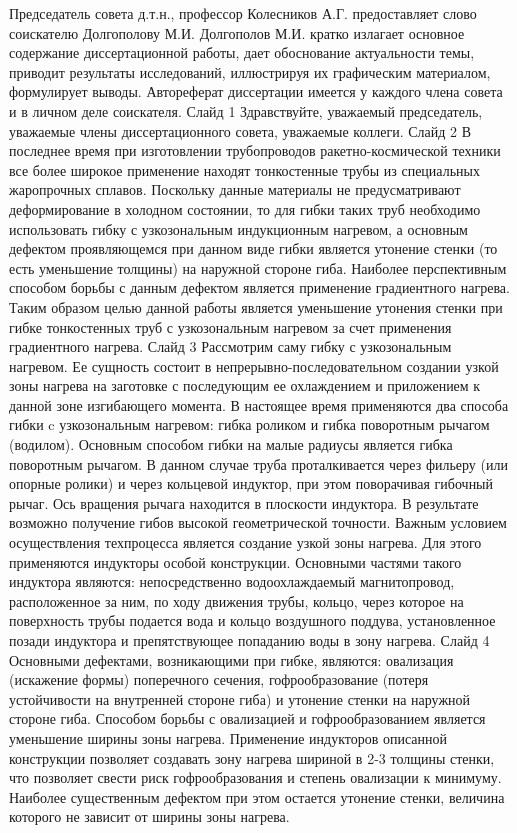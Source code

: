 Председатель совета д.т.н., профессор Колесников А.Г. предоставляет слово соискателю Долгополову М.И.
Долгополов М.И. кратко излагает основное содержание диссертационной работы, дает обоснование актуальности темы, приводит результаты исследований, иллюстрируя их графическим материалом, формулирует выводы. Автореферат диссертации имеется у каждого члена совета и в личном деле соискателя.
Слайд 1
Здравствуйте, уважаемый председатель, уважаемые члены диссертационного совета, уважаемые коллеги.
Слайд 2
В последнее время при изготовлении трубопроводов ракетно-космической техники все более широкое применение находят тонкостенные трубы из специальных жаропрочных сплавов. Поскольку данные материалы не предусматривают деформирование в холодном состоянии, то для гибки таких труб необходимо использовать гибку с узкозональным индукционным нагревом, а основным дефектом проявляющемся при данном виде гибки является утонение стенки (то есть уменьшение толщины) на наружной стороне гиба. Наиболее перспективным способом борьбы с данным дефектом является применение градиентного нагрева.
Таким образом целью данной работы является уменьшение утонения стенки при гибке тонкостенных труб с узкозональным нагревом за счет применения градиентного нагрева.
Слайд 3
Рассмотрим саму гибку с узкозональным нагревом. Ее сущность состоит в непрерывно-последовательном создании узкой зоны нагрева на заготовке с последующим ее охлаждением и приложением к данной зоне изгибающего момента.
В настоящее время применяются два способа гибки c узкозональным нагревом: гибка роликом и гибка поворотным рычагом (водилом). 
Основным способом гибки на малые радиусы является гибка поворотным рычагом. В данном случае труба проталкивается через фильеру (или опорные ролики) и через кольцевой индуктор, при этом поворачивая гибочный рычаг. Ось вращения рычага находится в плоскости индуктора. В результате возможно получение гибов высокой геометрической точности.
Важным условием осуществления техпроцесса является создание узкой зоны нагрева. Для этого применяются индукторы особой конструкции. Основными частями такого индуктора являются: непосредственно водоохлаждаемый магнитопровод, расположенное за ним, по ходу движения трубы, кольцо, через которое на поверхность трубы подается вода и кольцо воздушного поддува, установленное позади индуктора и препятствующее попаданию воды в зону нагрева. 
Слайд 4
Основными дефектами, возникающими при гибке, являются: овализация (искажение формы) поперечного сечения, гофрообразование (потеря устойчивости на внутренней стороне гиба) и утонение стенки на наружной стороне гиба.
Способом борьбы с овализацией и гофрообразованием является уменьшение ширины зоны нагрева. Применение индукторов описанной конструкции позволяет создавать зону нагрева шириной в 2-3 толщины стенки, что позволяет свести риск гофрообразования и степень овализации к минимуму. Наиболее существенным дефектом при этом остается утонение стенки, величина которого не зависит от ширины зоны нагрева.
